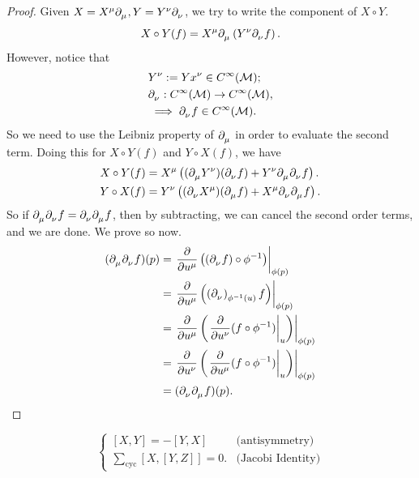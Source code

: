 \documentclass[../main.tex]{subfiles}
\begin{document}
    \begin{proof}
        Given \(X=X^\mu\tfld{\mu}, Y = Y^\nu\tfld{\nu}\), we try to write 
        the component of \(X\circ Y\).
        \[
        X\circ Y(f) = X^\mu \tfld{\mu}\left(Y^\nu \tfld{\nu}f\right).
        \]
        However, notice that 
        \[
        \begin{aligned}
            &Y^\nu := Yx^\nu \in C^\infty(\manifold[M]); \\
            &\tfld{\nu} : C^\infty(\manifold[M]) \to C^\infty(\manifold[M]), \\
            &\implies\tfld{\nu}f \in C^\infty(\manifold[M]).
        \end{aligned}
        \]
        So we need to use the Leibniz property of \(\tfld{\mu}\) 
        in order to evaluate the second term. Doing this 
        for \(X\circ Y(f)\) and \(Y\circ X(f)\), we have
        \[
        \begin{aligned}
            X\circ Y(f) &= X^\mu \left((\tfld{\mu}Y^\nu)(\tfld{\nu}f)+
            Y^\nu \tfld{\mu}\tfld{\nu}f\right). \\
            Y\circ X(f) &= Y^\nu \left((\tfld{\nu}X^\mu)(\tfld{\mu}f)+
            X^\mu \tfld{\nu}\tfld{\mu}f\right).
        \end{aligned}
        \]
        So if \(\tfld{\mu}\tfld{\nu}f=\tfld{\nu}\tfld{\mu}f\), then by 
        subtracting, we can cancel the second order terms, and we are done. We 
        prove so now.
        \[
        \begin{aligned}
            (\tfld{\mu}\tfld{\nu}f)(p)&=\left.\frac{\partial }{\partial u^\mu}
            \left((\tfld{\nu}f)\circ\phi ^{-1}\right)\right|_{\phi(p)} \\
            &=\left.\frac{\partial }{\partial u^\mu}
            \left(\tvec{\nu}{\phi ^{-1}(u)}f\right)\right|_{\phi(p)} \\
            &=\left.\frac{\partial }{\partial u^\mu}
            \left(\left.
                \frac{\partial }{\partial u^\nu}(f\circ\phi ^{-1})
            \right|_u\right)\right|_{\phi(p)} \\
            &=\left.\frac{\partial }{\partial u^\nu}
            \left(\left.
                \frac{\partial }{\partial u^\mu}(f\circ\phi ^{-1})
            \right|_u\right)\right|_{\phi(p)} \\
            &=(\tfld{\nu}\tfld{\mu}f)(p).
        \end{aligned}
        \]
    \end{proof}
    \newpage
    \begin{theorem}\label{thm:lie-bracket-properties}
        \[
        \begin{cases}
            [X,Y] = -[Y, X] & \text{(antisymmetry)} \\
            \sum_{\text{cyc}}^{} [X, [Y, Z]]=0. & \text{(Jacobi Identity)}
        \end{cases}
        \]
    \end{theorem}
\end{document}

